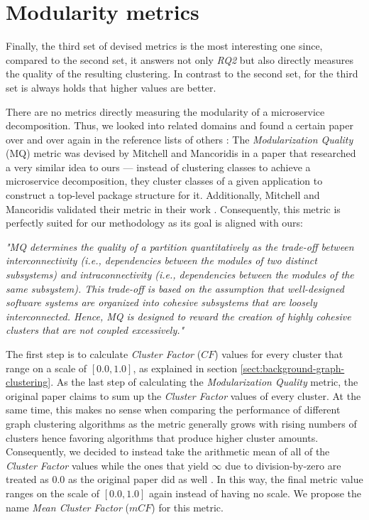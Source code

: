 \documentclass[12pt,a4paper]{report}
\begin{document}
\section{Modularity metrics}

Finally, the third set of devised metrics is the most interesting one since,
compared to the second set, it answers not only \textit{RQ2} but also directly
measures the quality of the resulting clustering. In contrast to the second
set, for the third set is always holds that higher values are better.

There are no metrics directly measuring the modularity of a microservice
decomposition. Thus, we looked into related domains and found a certain paper
over and over again in the reference lists of others \cite{
maqbool2007hierarchical, praditwong2010software, tsantalis2009identification,
jiang2006visualizing}: The \textit{Modularization Quality} (MQ) metric was
devised by Mitchell and Mancoridis \cite{mitchell2006automatic} in a paper that
researched a very similar idea to ours --- instead of clustering classes to
achieve a microservice decomposition, they cluster classes of a given
application to construct a top\hyp level package structure for it.
Additionally, Mitchell and Mancoridis validated their metric in their work
\cite{mitchell2006automatic}. Consequently, this metric is perfectly suited for
our methodology as its goal is aligned with ours:
\begin{displayquote}
  \emph{
  "MQ determines the quality of a partition quantitatively as the trade-off
  between interconnectivity (i.e., dependencies between the modules of two
  distinct subsystems) and intraconnectivity (i.e., dependencies between the
  modules of the same subsystem). This trade-off is based on the assumption that
  well-designed software systems are organized into cohesive subsystems that are
  loosely interconnected. Hence, MQ is designed to reward the creation of highly
  cohesive clusters that are not coupled excessively."
  }~\cite{mitchell2006automatic}
\end{displayquote}

The first step is to calculate \textit{Cluster Factor} ($CF$) values for every
cluster that range on a scale of \([0.0, 1.0]\), as explained in section
\ref{sect:background-graph-clustering}. As the last step of calculating the
\textit{Modularization Quality} metric, the original paper claims to sum up the
\textit{Cluster Factor} values of every cluster. At the same time, this makes no sense
when comparing the performance of different graph clustering algorithms as the
metric generally grows with rising numbers of clusters hence favoring
algorithms that produce higher cluster amounts. Consequently, we decided to
instead take the arithmetic mean of all of the \textit{Cluster Factor} values
while the ones that yield $\infty$ due to division\hyp by\hyp zero are treated
as $0.0$ as the original paper did as well \cite{mitchell2006automatic}. In
this way, the final metric value ranges on the scale of \([0.0, 1.0]\) again
instead of having no scale. We propose the name \textit{Mean Cluster Factor}
($mCF$) for this metric.
\end{document}
